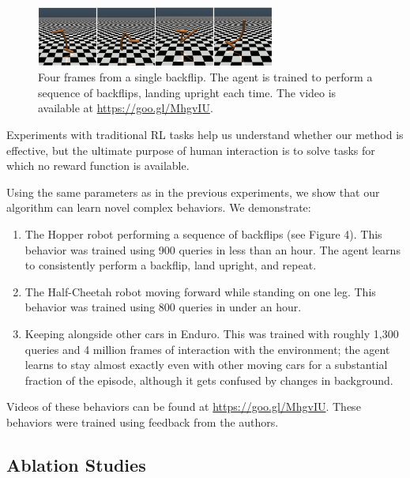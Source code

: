\documentclass{article}
\newif\ifanony  %
\begin{document}
\begin{figure}[t]
\begin{center}
\includegraphics[width=0.7\textwidth]{flip.png}
\end{center}
\caption{Four frames from a single backflip.
The agent is trained to perform a sequence of backflips, landing upright each time.
The video is available \ifanony in the supplementary material\else at \url{https://goo.gl/MhgvIU}\fi.}
\label{fig:backflip}
\end{figure}

Experiments with traditional RL tasks help us understand whether our method is effective, but the ultimate purpose of human interaction is to solve tasks for which no reward function is available.

Using the same parameters as in the previous experiments, we show that our algorithm can learn novel complex behaviors. We demonstrate:
\begin{enumerate}
\item The Hopper robot performing a sequence of backflips (see Figure 4). This behavior was trained using 900 queries in less than an hour. The agent learns to consistently perform a backflip, land upright, and repeat.
\item The Half-Cheetah robot moving forward while standing on one leg. This behavior was trained using 800 queries in under an hour.
\item Keeping alongside other cars in Enduro. This was trained with roughly 1,300 queries and 4 million frames of interaction with the environment; the agent learns to stay almost exactly even with other moving cars for a substantial fraction of the episode, although it gets confused by changes in background.
\end{enumerate}
Videos of these behaviors can be found \ifanony in the supplementary material\else  at \url{https://goo.gl/MhgvIU}\fi.
These behaviors were trained using feedback from the authors.


\subsection{Ablation Studies}
\label{ssec:ablation}
\end{document}
